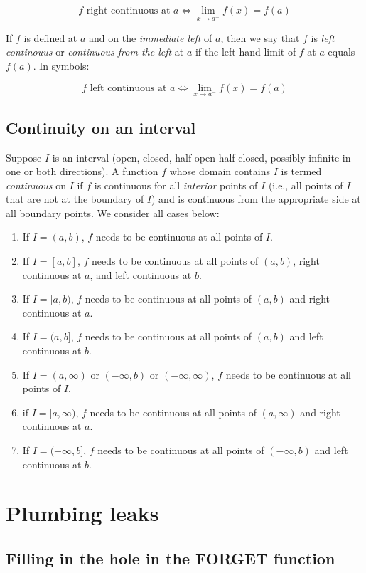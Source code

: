 \documentclass[10pt]{amsart}
\begin{document}
$$f \text{ right continuous at } a \iff \lim_{x \to a^+}f(x) = f(a)$$

If $f$ is defined at $a$ and on the {\em immediate left} of $a$, then
we say that $f$ is {\em left continouus} or {\em continuous from the
left} at $a$ if the left hand limit of $f$ at $a$ equals $f(a)$. In symbols:

$$f \text{ left continuous at } a \iff \lim_{x \to a^-}f(x) = f(a)$$

\subsection{Continuity on an interval}

Suppose $I$ is an interval (open, closed, half-open half-closed,
possibly infinite in one or both directions). A function $f$ whose
domain contains $I$ is termed {\em continuous} on $I$ if $f$ is
continuous for all {\em interior} points of $I$ (i.e., all points of
$I$ that are not at the boundary of $I$) and is continuous from the
appropriate side at all boundary points. We consider all cases below:

\begin{enumerate}
\item If $I = (a,b)$, $f$ needs to be continuous at all points of $I$.
\item If $I = [a,b]$, $f$ needs to be continuous at all points of
  $(a,b)$, right continuous at $a$, and left continuous at $b$.
\item If $I = [a,b)$, $f$ needs to be continuous at all points of
  $(a,b)$ and right continuous at $a$.
\item If $I = (a,b]$, $f$ needs to be continuous at all points of
  $(a,b)$ and left continuous at $b$.
\item If $I = (a,\infty)$ or $(-\infty,b)$ or $(-\infty,\infty)$, $f$
  needs to be continuous at all points of $I$.
\item if $I = [a,\infty)$, $f$ needs to be continuous at all points of
  $(a,\infty)$ and right continuous at $a$.
\item If $I = (-\infty,b]$, $f$ needs to be continuous at all points
  of $(-\infty,b)$ and left continuous at $b$.
\end{enumerate}

\section{Plumbing leaks}

\subsection{Filling in the hole in the FORGET function}
\end{document}

